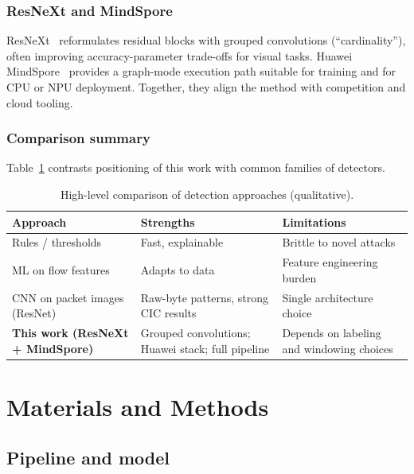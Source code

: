 \subsection{ResNeXt and MindSpore}
ResNeXt~\cite{xie2017aggregated} reformulates residual blocks with grouped
convolutions (``cardinality''), often improving accuracy-parameter trade-offs for
visual tasks. Huawei MindSpore~\cite{mindspore2020} provides a graph-mode
execution path suitable for training and for CPU or NPU deployment. Together,
they align the method with competition and cloud tooling.

\subsection{Comparison summary}
Table~\ref{tab:related} contrasts positioning of this work with common families
of detectors.

\begin{table}[htbp]
\centering
\caption[High-level comparison of detection approaches]{High-level comparison of detection approaches (qualitative).}
\begin{tabular}{|>{\raggedright\arraybackslash}p{3.0cm}|>{\raggedright\arraybackslash}p{4.6cm}|>{\raggedright\arraybackslash}p{4.6cm}|}
\hline
\textbf{Approach} & \textbf{Strengths} & \textbf{Limitations} \\
\hline
Rules / thresholds & Fast, explainable & Brittle to novel attacks \\
\hline
ML on flow features & Adapts to data & Feature engineering burden \\
\hline
CNN on packet images (ResNet)~\cite{bazzi2022resnet} & Raw-byte patterns, strong CIC results & Single architecture choice \\
\hline
\textbf{This work (ResNeXt + MindSpore)} & Grouped convolutions; Huawei stack; full pipeline & Depends on labeling and windowing choices \\
\hline
\end{tabular}
\label{tab:related}
\end{table}


\chapter{Materials and Methods}
\label{chapter:3}

\section{Pipeline and model}
